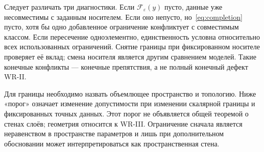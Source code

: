{Следует различать три диагностики. Если $\mathcal F_\varepsilon(y)$ пусто, данные уже несовместимы с заданным носителем. Если оно непусто, но~\eqref{eq:completion} пусто, хотя бы одно добавленное ограничение конфликтует с совместимым классом. Если пересечение одноэлементно, единственность условна относительно всех использованных ограничений. Снятие границы при фиксированном носителе проверяет её вклад; смена носителя является другим сравнением моделей. Такие конечные конфликты --- конечные препятствия, а не полный конечный дефект WR-II.}

{Для границы необходимо назвать объемлющее пространство и топологию. Ниже «порог» означает изменение допустимости при изменении скалярной границы и фиксированных точных данных. Этот порог не объявляется общей теоремой о стенах слоёв; геометрия относится к WR-III. Ограничение сначала является неравенством в пространстве параметров и лишь при дополнительном обосновании может интерпретироваться как пространственная стена.}

